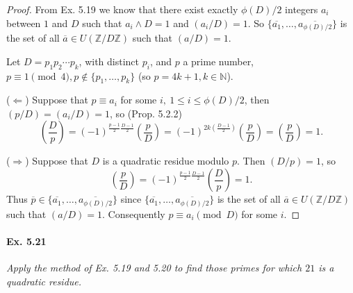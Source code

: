\documentclass[11pt,a4paper]{article}
\newcommand{\Z}{\mathbb{Z}}
\newcommand{\N}{\mathbb{N}}
\newcommand{\legendre}[2]{\genfrac{(}{)}{}{}{#1}{#2}}
\begin{document}
\begin{proof}
From Ex. 5.19 we know that there exist exactly $\phi(D)/2$ integers $a_i$ between $1$ and $D$ such that $a_i \wedge D = 1$ and $(a_i/D)= 1$. So $\{\overline{a_1},\ldots,\overline{a_{\phi(D)/2}}\}$ is the set of all $\overline{a} \in U(\Z/D\Z)$ such that $ (a/D) = 1$.

Let $D = p_1p_2\cdots p_k$, with distinct $p_i$, and $p$ a prime number, $p\equiv 1 \pmod 4, p \not \in \{p_1,\ldots,p_k\}$ (so $p = 4k+1, k \in \N$).

($\Leftarrow$)  Suppose that  $p \equiv a_i$ for some $i,\ 1\leq i \leq \phi(D)/2$, then $(p/D) = (a_i/D) = 1$, so (Prop. 5.2.2)
$$\legendre{D}{p} = (-1)^{\frac{p-1}{2} \frac{D-1}{2}} \legendre {p}{D} = (-1)^{2k\left(\frac{D-1}{2}\right)} \legendre {p}{D} = \legendre {p}{D} = 1 .$$

($\Rightarrow$) Suppose that $D$ is a quadratic residue modulo $p$. Then $(D/p) = 1$, so 
$$\legendre{p}{D} = (-1)^{\frac{p-1}{2} \frac{D-1}{2}} \legendre {D}{p} = 1.$$
Thus $\overline{p} \in \{\overline{a_1},\ldots,\overline{a_{\phi(D)/2}}\}$ since $\{\overline{a_1},\ldots,\overline{a_{\phi(D)/2}}\}$ is the set of all $\overline{a} \in U(\Z/D\Z)$ such that $ (a/D) = 1$.
Consequently $p \equiv a_i \pmod D$ for some $i$.
\end{proof}

\paragraph{Ex. 5.21}

{\it  Apply the method of Ex. 5.19 and 5.20 to find those primes for which $21$ is a quadratic residue.
}
\end{document}
